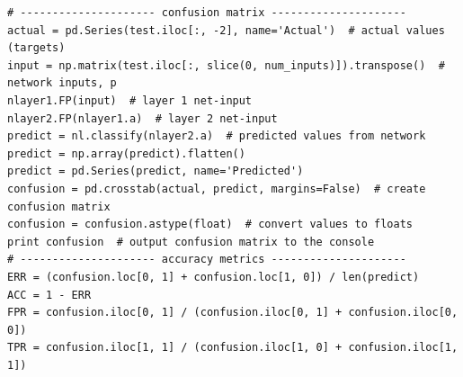 \documentclass[12pt,halfline,a4paper]{ouparticle}
\begin{document}
\begin{lstlisting}[style = Python]
# --------------------- confusion matrix ---------------------
actual = pd.Series(test.iloc[:, -2], name='Actual')  # actual values (targets)
input = np.matrix(test.iloc[:, slice(0, num_inputs)]).transpose()  # network inputs, p
nlayer1.FP(input)  # layer 1 net-input
nlayer2.FP(nlayer1.a)  # layer 2 net-input
predict = nl.classify(nlayer2.a)  # predicted values from network
predict = np.array(predict).flatten()
predict = pd.Series(predict, name='Predicted')
confusion = pd.crosstab(actual, predict, margins=False)  # create confusion matrix
confusion = confusion.astype(float)  # convert values to floats
print confusion  # output confusion matrix to the console
# --------------------- accuracy metrics ---------------------
ERR = (confusion.loc[0, 1] + confusion.loc[1, 0]) / len(predict)
ACC = 1 - ERR
FPR = confusion.iloc[0, 1] / (confusion.iloc[0, 1] + confusion.iloc[0, 0])
TPR = confusion.iloc[1, 1] / (confusion.iloc[1, 0] + confusion.iloc[1, 1])
\end{lstlisting} 
\end{document}
